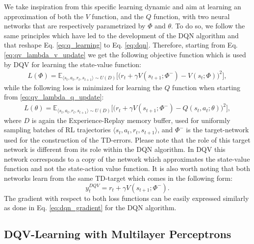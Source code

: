 We take inspiration from this specific learning dynamic and aim at learning an approximation of both the $V$ function, and the $Q$ function, with two neural networks that are respectively parametrized by $\Phi$ and $\theta$. To do so, we follow the same principles which have led to the development of the DQN algorithm and that reshape Eq. \ref{eq:q_learning} to Eq. \ref{eq:dqn}. Therefore, starting from Eq.\ref{eq:qv_lambda_v_update} we get the following objective function which is used by DQV for learning the state-value function:
\begin{multline}
L(\Phi) = \mathds{E}_{\langle s_{t},a_{t},r_{t},s_{t+1}\rangle\sim U(D)} \bigg[\big(r_{t} + \gamma V(s_{t+1}; \Phi^{-}) - V(s_{t}; \Phi)\big)^{2}\bigg],
\label{eq:dqv_v_update}
\end{multline}
while the following loss is minimized for learning the $Q$ function when starting from \ref{eq:qv_lambda_q_update}:
\begin{multline}
    L(\theta) = \mathds{E}_{\langle s_{t},a_{t},r_{t},s_{t+1}\rangle\sim U(D)} \bigg[\big(r_{t} + \gamma V(s_{t+1}; \Phi^{-}) - Q(s_{t}, a_{t}; \theta)\big)^{2}\bigg],
\label{eq:dqv_q_update}
\end{multline}
where $D$ is again the Experience-Replay memory buffer, used for uniformly sampling batches of RL trajectories $\langle s_{t},a_{t},r_{t},s_{t+1}\rangle$, and $\Phi^{-}$ is the target-network used for the construction of the TD-errors. Please note that the role of this target network is different from its role within the DQN algorithm. In DQV this network corresponds to a copy of the network which approximates the state-value function and not the state-action value function. It is also worth noting that both networks learn from the same TD-target which comes in the following form:
\begin{equation}
y_{t}^{DQV} = r_{t} + \gamma V(s_{t+1}; \Phi^{-}). 
\end{equation}
The gradient with respect to both loss functions can be easily expressed similarly as done in Eq. \ref{eq:dqn_gradient} for the DQN algorithm.

\subsection{DQV-Learning with Multilayer Perceptrons}



